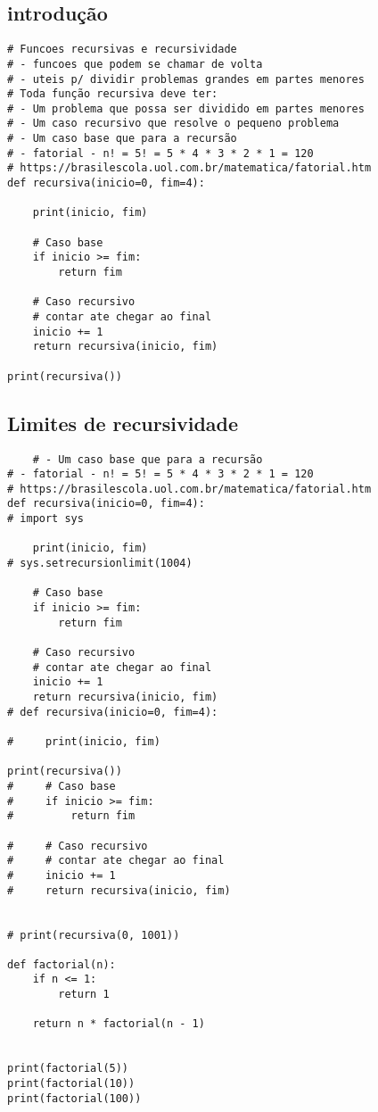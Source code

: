 \documentclass{article}
\begin{document}
\subsection*{introdução}
\begin{lstlisting}
# Funcoes recursivas e recursividade
# - funcoes que podem se chamar de volta
# - uteis p/ dividir problemas grandes em partes menores
# Toda função recursiva deve ter:
# - Um problema que possa ser dividido em partes menores
# - Um caso recursivo que resolve o pequeno problema
# - Um caso base que para a recursão
# - fatorial - n! = 5! = 5 * 4 * 3 * 2 * 1 = 120
# https://brasilescola.uol.com.br/matematica/fatorial.htm
def recursiva(inicio=0, fim=4):

    print(inicio, fim)

    # Caso base
    if inicio >= fim:
        return fim

    # Caso recursivo
    # contar ate chegar ao final
    inicio += 1
    return recursiva(inicio, fim)

print(recursiva())
\end{lstlisting}
\subsection{Limites de recursividade}
\begin{lstlisting}
    # - Um caso base que para a recursão
# - fatorial - n! = 5! = 5 * 4 * 3 * 2 * 1 = 120
# https://brasilescola.uol.com.br/matematica/fatorial.htm
def recursiva(inicio=0, fim=4):
# import sys

    print(inicio, fim)
# sys.setrecursionlimit(1004)

    # Caso base
    if inicio >= fim:
        return fim

    # Caso recursivo
    # contar ate chegar ao final
    inicio += 1
    return recursiva(inicio, fim)
# def recursiva(inicio=0, fim=4):

#     print(inicio, fim)

print(recursiva())
#     # Caso base
#     if inicio >= fim:
#         return fim

#     # Caso recursivo
#     # contar ate chegar ao final
#     inicio += 1
#     return recursiva(inicio, fim)


# print(recursiva(0, 1001))

def factorial(n):
    if n <= 1:
        return 1

    return n * factorial(n - 1)


print(factorial(5))
print(factorial(10))
print(factorial(100))
\end{lstlisting}
\end{document}
